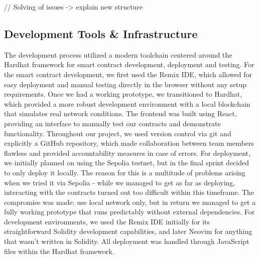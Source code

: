 \documentclass[11pt,a4paper]{article}
\begin{document}
	// Solving of issues -> explain new structure


	\subsection{Development Tools \& Infrastructure}\label{subsec:development-tools-infrastructure}
	The development process utilized a modern toolchain centered around the Hardhat framework for smart contract development, deployment and testing.
	For the smart contract development, we first used the Remix IDE, which allowed for easy deployment and manual testing directly in the browser without any setup requirements.
	Once we had a working prototype, we transitioned to Hardhat, which provided a more robust development environment with a local blockchain that simulates real network conditions.
	The frontend was built using React, providing an interface to manually test our contracts and demonstrate functionality.
	Throughout our project, we used version control via git and explicitly a GitHub repository, which made collaboration between team members flawless and provided accountability measures in case of errors.
	For deployment, we initially planned on using the Sepolia testnet, but in the final sprint decided to only deploy it locally.
	The reason for this is a multitude of problems arising when we tried it via Sepolia - while we managed to get as far as deploying, interacting with the contracts turned out too difficult within this timeframe.
	The compromise was made: use local network only, but in return we managed to get a fully working prototype that runs predictably without external dependencies.
	For development environments, we used the Remix IDE initially for its straightforward Solidity development capabilities, and later Neovim for anything that wasn't written in Solidity.
	All deployment was handled through JavaScript files within the Hardhat framework. 

\end{document}
